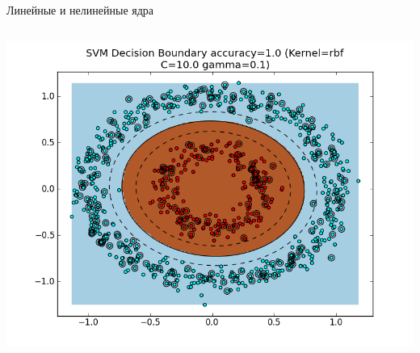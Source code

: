 \documentclass[notheorems, handout]{beamer}
\begin{document}
\begin{frame}{Линейные и нелинейные ядра}
\begin{columns}
\begin{column}{0.5\textwidth}
			\includegraphics[width=\textwidth]{img/rbf_kernel}
		\end{column}
	\end{columns}
\end{frame}
\end{document}
